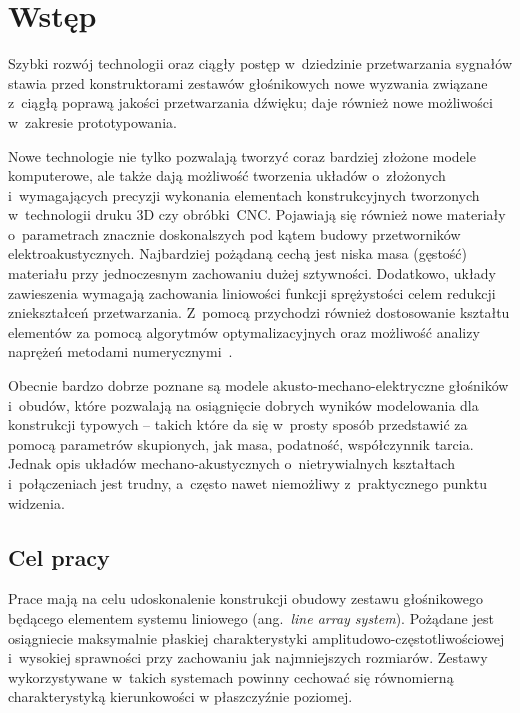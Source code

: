 \documentclass[12pt]{oska}
\affiliation{Akademia Górniczo-Hutnicza im. S. Staszica w Krakowie}
\begin{document}
	
	\maketitles
	
	\section{Wstęp}
	
	Szybki rozwój technologii oraz ciągły postęp w~dziedzinie przetwarzania sygnałów stawia przed konstruktorami zestawów głośnikowych nowe wyzwania związane z~ciągłą poprawą jakości przetwarzania dźwięku; daje również nowe możliwości w~zakresie prototypowania. 
	
	Nowe technologie nie tylko pozwalają tworzyć coraz bardziej złożone modele komputerowe, ale także dają możliwość tworzenia układów o~złożonych i~wymagających precyzji wykonania elementach konstrukcyjnych tworzonych w~technologii druku 3D czy obróbki~CNC. Pojawiają się również nowe materiały o~parametrach znacznie doskonalszych pod kątem budowy przetworników elektroakustycznych. Najbardziej pożądaną cechą jest niska masa (gęstość) materiału przy jednoczesnym zachowaniu dużej sztywności. Dodatkowo, układy zawieszenia wymagają zachowania liniowości funkcji sprężystości celem redukcji zniekształceń przetwarzania. Z~pomocą przychodzi również dostosowanie kształtu elementów za pomocą algorytmów optymalizacyjnych oraz możliwość analizy naprężeń metodami numerycznymi~\cite{naprezenia}.
	
	Obecnie bardzo dobrze poznane są modele akusto-mechano-elektryczne głośników i~obudów, które pozwalają na osiągnięcie dobrych wyników modelowania dla konstrukcji typowych -- takich które da się w~prosty sposób przedstawić za pomocą parametrów skupionych, jak masa, podatność, współczynnik tarcia. Jednak opis układów mechano-akustycznych o~nietrywialnych kształtach i~połączeniach jest trudny, a~często nawet niemożliwy z~praktycznego punktu widzenia.
	
	\subsection{Cel pracy}
	
	Prace mają na celu udoskonalenie konstrukcji obudowy zestawu głośnikowego będącego elementem systemu liniowego (ang.~\textit{line array system}). Pożądane jest osiągniecie maksymalnie płaskiej charakterystyki amplitudowo-częstotliwościowej i~wysokiej sprawności przy zachowaniu jak najmniejszych rozmiarów. Zestawy wykorzystywane w~takich systemach powinny cechować się równomierną charakterystyką kierunkowości w płaszczyźnie poziomej.
	
\end{document}
